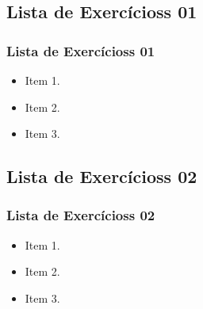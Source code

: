 \subsection[Lista de Exercícioss 01]{Lista de Exercícioss 01}\label{subsec:listas-lista01}



\begin{frame}[t]\frametitle{Lista de Exercícioss 01}

  \begin{itemize}
    \justifying{}
    \setlength\itemsep{1em}
    \item Item 1.
    \item Item 2.
    \item Item 3.
  \end{itemize}

\end{frame}



\subsection[Lista de Exercícioss 02]{Lista de Exercícioss 02}\label{subsec:listas-lista02}



\begin{frame}[t]\frametitle{Lista de Exercícioss 02}

  \begin{itemize}
    \justifying{}
    \setlength\itemsep{1em}
    \item Item 1.
    \item Item 2.
    \item Item 3.
  \end{itemize}

\end{frame}
